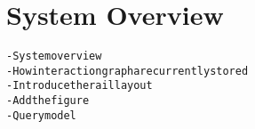 \section{System Overview}\label{sec:system}
\begin{alltt}\scriptsize
- System overview
    - How interaction graph are currently stored
    - Introduce the rail layout
    - Add the figure
    - Query model
\end{alltt}
